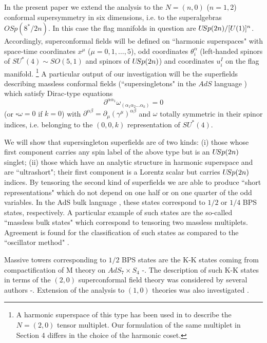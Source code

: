 \documentclass[a4paper,12pt]{article}
\begin{document}
In the present paper we extend the analysis to the $N=(n,0)$ 
($n=1,2$) conformal supersymmetry in six dimensions, i.e. to the  
superalgebras $OSp(8^*/2n)$. In this case the flag manifolds in 
question are $U\hskip-2pt Sp(2n)/[U(1)]^n$. Accordingly, 
superconformal fields will be defined on ``harmonic superspaces" 
with space-time coordinates $x^\mu$ ($\mu=0,1,\ldots,5$), odd 
coordinates $\theta^\alpha_i$ (left-handed spinors of $SU^*(4)\sim 
SO(5,1)$ and spinors of $U\hskip-2pt Sp(2n)$) and coordinates 
$u^I_i$ on the flag manifold. \footnote{A harmonic superspace of 
this type has been used in \cite{Howe} to describe the $N=(2,0)$ 
tensor multiplet. Our formulation of the same multiplet in Section 
4 differs in the choice of the harmonic coset.} A particular 
output of our investigation will be the superfields describing 
massless conformal fields (``supersingletons" in the $AdS$ 
language \cite{ff2}) which satisfy Dirac-type equations 
\begin{equation}\label{0}
  \partial^{\alpha\alpha_1} 
\omega_{(\alpha_1\alpha_2\ldots\alpha_k)} = 0 
\end{equation}
(or $\square \omega=0$ if $k=0$) with $\partial^{\alpha\beta} = 
\partial_\mu (\gamma^\mu)^{\alpha\beta}$ and $\omega$ totally symmetric 
in their spinor indices, i.e. belonging to the $(0,0,k)$ 
representation of $SU^*(4)$.



We will show that supersingleton superfields are of two kinds: (i) 
those whose first component carries any spin label of the above 
type but is an $U\hskip-2pt Sp(2n)$ singlet; (ii) those which have 
an analytic structure in harmonic superspace and are 
``ultrashort"; their first component is a Lorentz scalar but 
carries  $U\hskip-2pt Sp(2n)$ indices. By tensoring the second 
kind of superfields we are able to produce ``short 
representations" which do not depend on one half or on one quarter 
of the odd variables. In the AdS bulk language \cite{FF}, these 
states correspond to $1/2$ or $1/4$ BPS states, respectively. A 
particular example of such states are the so-called ``massless 
bulk states" which correspond to tensoring two massless 
multiplets. Agreement is found for the classification of such 
states as compared to the ``oscillator method" \cite{GT}. 


Massive towers corresponding to $1/2$ BPS states are the K-K 
states \cite{GNW} coming from compactification of M theory on  
$AdS_7\times S_4$ \cite{PPN}-\cite{MTN}. The description of such 
K-K states in terms of the $(2,0)$ superconformal field theory was 
considered by several authors \cite{AOY}-\cite{ ABS}. Extension 
of the analysis to $(1,0)$ theories was also investigated 
\cite{FKPZ,GP}. 
\end{document}
